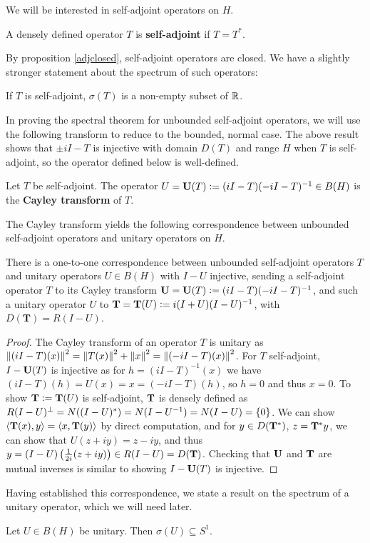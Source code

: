 \documentclass[10pt]{amsart}
\begin{document}
We will be interested in self-adjoint operators on $H$.
\begin{definition}
    A densely defined operator $T$ is \textbf{self-adjoint} if $T = T^*$.
\end{definition}
By proposition \ref{adjclosed}, self-adjoint operators are closed. We have a slightly stronger statement about the spectrum of such operators:
\begin{lemma}
    If $T$ is self-adjoint, $\sigma(T)$ is a non-empty subset of $\mathbb{R}$.
\end{lemma}
In proving the spectral theorem for unbounded self-adjoint operators, we will use the following transform to reduce to the bounded, normal case. The above result shows that $\pm iI - T$ is injective with domain $D(T)$ and range $H$ when $T$ is self-adjoint, so the operator defined below is well-defined.
\begin{definition}
    Let $T$ be self-adjoint. The operator $U = \mathbf{U}(T) \vcentcolon= (iI - T)(-iI - T)^{-1} \in B(H)$ is the \textbf{Cayley transform} of $T$.
\end{definition}
The Cayley transform yields the following correspondence between unbounded self-adjoint operators and unitary operators on $H$.
\begin{proposition}\label{corresp}
    There is a one-to-one correspondence between unbounded self-adjoint operators $T$ and unitary operators $U \in B(H)$ with $I - U$ injective, sending a self-adjoint operator $T$ to its Cayley transform $\mathbf U = \mathbf U(T) \vcentcolon= (iI - T)(-iI - T)^{-1}$, and such a unitary operator $U$ to $\mathbf T = \mathbf T(U) \vcentcolon= i(I + U)(I - U)^{-1}$, with $D(\mathbf T) = R(I - U)$.
\end{proposition}
\begin{proof}
    The Cayley transform of an operator $T$ is unitary as $\left\| (iI - T)(x) \right\|^2 = \left\| T(x) \right\|^2 + \left\| x \right\|^2 = \left\| (-iI - T)(x) \right\|^2$. For $T$ self-adjoint, $I - \mathbf{U}(T)$ is injective as for $h = (iI - T)^{-1}(x)$ we have $(iI - T)(h) = U(x) = x = (-iI - T)(h)$, so $h = 0$ and thus $x = 0$. To show $\mathbf{T} \vcentcolon= \mathbf{T}(U)$ is self-adjoint, $\mathbf{T}$ is densely defined as $R(I - U)^\perp = N((I - U)^*) = N(I - U^{-1}) = N(I - U) = \left\{  0  \right\}$. We can show $\left\langle \mathbf{T}(x), y \right\rangle = \left\langle x, \mathbf{T}(y) \right\rangle$ by direct computation, and for $y \in D(\mathbf{T}^*)$, $z = \mathbf{T}^*y$, we can show that $U(z + iy) = z - iy$, and thus $y = (I - U)\left(  \frac1{2i}(z + iy)  \right) \in R(I - U) = D(\mathbf{T})$. Checking that $\mathbf{U}$ and $\mathbf{T}$ are mutual inverses is similar to showing $I - \mathbf{U}(T)$ is injective.
\end{proof}
Having established this correspondence, we state a result on the spectrum of a unitary operator, which we will need later.
\begin{proposition}
    Let $U \in B(H)$ be unitary. Then $\sigma(U) \subseteq S^1$.
\end{proposition}
\end{document}
